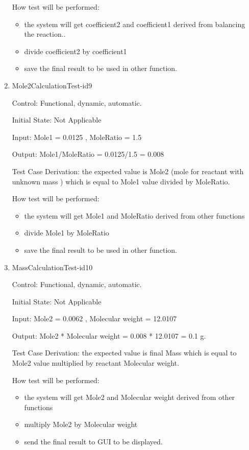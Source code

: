 \documentclass[12pt, titlepage]{article}
\begin{document}
\begin{enumerate}
How test will be performed: 
\begin{itemize}
\item the system will get coefficient2 and coefficient1 derived from balancing the reaction..
\item divide coefficient2 by coefficient1  
\item save the final result to be used in other function.
\end{itemize}

\item{Mole2CalculationTest-id9\\}

Control: Functional, dynamic, automatic.
					
Initial State: Not Applicable
					
Input: Mole1 = 0.0125  , MoleRatio = 1.5
			
Output:  Mole1/MoleRatio = 0.0125/1.5 =  0.008

Test Case Derivation: the expected value is Mole2 (mole for reactant with unknown mass ) which is equal to Mole1 value divided by MoleRatio.  				
	
How test will be performed: 
\begin{itemize}
\item the system will get Mole1 and MoleRatio derived from other functions
\item divide Mole1 by MoleRatio  
\item save the final result to be used in other function.
\end{itemize}

\item{MassCalculationTest-id10\\}

Control: Functional, dynamic, automatic.
					
Initial State: Not Applicable
					
Input: Mole2 = 0.0062  , Molecular weight = 12.0107
			
Output:  Mole2 * Molecular weight = 0.008 * 12.0107 = 0.1 g.

Test Case Derivation: the expected value is final Mass which is equal to Mole2 value multiplied by reactant Molecular weight.  				

How test will be performed: 
\begin{itemize}
\item the system will get Mole2 and Molecular weight derived from other functions
\item multiply Mole2 by Molecular weight  
\item send the final result to GUI to be displayed.
\end{itemize}

\end{enumerate}		
	
\end{document}
